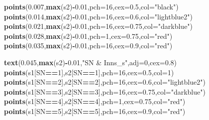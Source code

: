 \documentclass[]{article}
\newenvironment{Shaded}{\begin{snugshade}}{\end{snugshade}}
\newcommand{\DataTypeTok}[1]{\textcolor[rgb]{0.13,0.29,0.53}{#1}}
\newcommand{\DecValTok}[1]{\textcolor[rgb]{0.00,0.00,0.81}{#1}}
\newcommand{\FloatTok}[1]{\textcolor[rgb]{0.00,0.00,0.81}{#1}}
\newcommand{\KeywordTok}[1]{\textcolor[rgb]{0.13,0.29,0.53}{\textbf{#1}}}
\newcommand{\NormalTok}[1]{#1}
\newcommand{\OperatorTok}[1]{\textcolor[rgb]{0.81,0.36,0.00}{\textbf{#1}}}
\newcommand{\StringTok}[1]{\textcolor[rgb]{0.31,0.60,0.02}{#1}}
\begin{document}
\begin{Shaded}
\begin{Highlighting}[]
\KeywordTok{points}\NormalTok{(}\FloatTok{0.007}\NormalTok{,}\KeywordTok{max}\NormalTok{(s2)}\OperatorTok{-}\FloatTok{0.01}\NormalTok{,}\DataTypeTok{pch=}\DecValTok{16}\NormalTok{,}\DataTypeTok{cex=}\FloatTok{0.5}\NormalTok{,}\DataTypeTok{col=}\StringTok{"black"}\NormalTok{)}
\KeywordTok{points}\NormalTok{(}\FloatTok{0.014}\NormalTok{,}\KeywordTok{max}\NormalTok{(s2)}\OperatorTok{-}\FloatTok{0.01}\NormalTok{,}\DataTypeTok{pch=}\DecValTok{16}\NormalTok{,}\DataTypeTok{cex=}\FloatTok{0.6}\NormalTok{,}\DataTypeTok{col=}\StringTok{"lightblue2"}\NormalTok{)}
\KeywordTok{points}\NormalTok{(}\FloatTok{0.021}\NormalTok{,}\KeywordTok{max}\NormalTok{(s2)}\OperatorTok{-}\FloatTok{0.01}\NormalTok{,}\DataTypeTok{pch=}\DecValTok{16}\NormalTok{,}\DataTypeTok{cex=}\FloatTok{0.75}\NormalTok{,}\DataTypeTok{col=}\StringTok{"darkblue"}\NormalTok{)}
\KeywordTok{points}\NormalTok{(}\FloatTok{0.028}\NormalTok{,}\KeywordTok{max}\NormalTok{(s2)}\OperatorTok{-}\FloatTok{0.01}\NormalTok{,}\DataTypeTok{pch=}\DecValTok{1}\NormalTok{,}\DataTypeTok{cex=}\FloatTok{0.75}\NormalTok{,}\DataTypeTok{col=}\StringTok{"red"}\NormalTok{)}
\KeywordTok{points}\NormalTok{(}\FloatTok{0.035}\NormalTok{,}\KeywordTok{max}\NormalTok{(s2)}\OperatorTok{-}\FloatTok{0.01}\NormalTok{,}\DataTypeTok{pch=}\DecValTok{16}\NormalTok{,}\DataTypeTok{cex=}\FloatTok{0.9}\NormalTok{,}\DataTypeTok{col=}\StringTok{"red"}\NormalTok{)}

\KeywordTok{text}\NormalTok{(}\FloatTok{0.045}\NormalTok{,}\KeywordTok{max}\NormalTok{(s2)}\OperatorTok{-}\FloatTok{0.01}\NormalTok{,}\StringTok{"SN & Inns_s"}\NormalTok{,}\DataTypeTok{adj=}\DecValTok{0}\NormalTok{,}\DataTypeTok{cex=}\FloatTok{0.8}\NormalTok{)}
\KeywordTok{points}\NormalTok{(s1[SN}\OperatorTok{==}\DecValTok{1}\NormalTok{],s2[SN}\OperatorTok{==}\DecValTok{1}\NormalTok{],}\DataTypeTok{pch=}\DecValTok{16}\NormalTok{,}\DataTypeTok{cex=}\FloatTok{0.5}\NormalTok{,}\DataTypeTok{col=}\DecValTok{1}\NormalTok{)}
\KeywordTok{points}\NormalTok{(s1[SN}\OperatorTok{==}\DecValTok{2}\NormalTok{],s2[SN}\OperatorTok{==}\DecValTok{2}\NormalTok{],}\DataTypeTok{pch=}\DecValTok{16}\NormalTok{,}\DataTypeTok{cex=}\FloatTok{0.6}\NormalTok{,}\DataTypeTok{col=}\StringTok{"lightblue2"}\NormalTok{)}
\KeywordTok{points}\NormalTok{(s1[SN}\OperatorTok{==}\DecValTok{3}\NormalTok{],s2[SN}\OperatorTok{==}\DecValTok{3}\NormalTok{],}\DataTypeTok{pch=}\DecValTok{16}\NormalTok{,}\DataTypeTok{cex=}\FloatTok{0.75}\NormalTok{,}\DataTypeTok{col=}\StringTok{"darkblue"}\NormalTok{)}
\KeywordTok{points}\NormalTok{(s1[SN}\OperatorTok{==}\DecValTok{4}\NormalTok{],s2[SN}\OperatorTok{==}\DecValTok{4}\NormalTok{],}\DataTypeTok{pch=}\DecValTok{1}\NormalTok{,}\DataTypeTok{cex=}\FloatTok{0.75}\NormalTok{,}\DataTypeTok{col=}\StringTok{"red"}\NormalTok{)}
\KeywordTok{points}\NormalTok{(s1[SN}\OperatorTok{==}\DecValTok{5}\NormalTok{],s2[SN}\OperatorTok{==}\DecValTok{5}\NormalTok{],}\DataTypeTok{pch=}\DecValTok{16}\NormalTok{,}\DataTypeTok{cex=}\FloatTok{0.9}\NormalTok{,}\DataTypeTok{col=}\StringTok{"red"}\NormalTok{)}


\end{Highlighting}
\end{Shaded}
\end{document}
